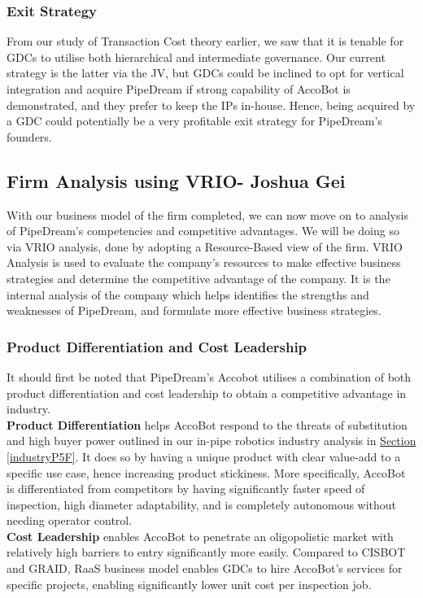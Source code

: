 \documentclass[11pt]{article}		%
\newcommand{\sectref}[1]{\hyperref[#1]{Section \ref*{#1}}}     %
\begin{document}
    	\subsubsection{Exit Strategy}
    	From our study of Transaction Cost theory earlier, we saw that it is tenable for GDCs to utilise both hierarchical and intermediate governance. Our current strategy is the latter via the JV, but GDCs could be inclined to opt for vertical integration and acquire PipeDream if strong capability of AccoBot is demonstrated, and they prefer to keep the IPs in-house. Hence, being acquired by a GDC could potentially be a very profitable exit strategy for PipeDream’s founders. 
            
	\subsection[Firm Analysis using VRIO]{Firm Analysis using VRIO- Joshua Gei}
	With our business model of the firm completed, we can now move on to analysis of PipeDream's competencies and competitive advantages. We will be doing so via VRIO analysis, done by adopting a Resource-Based view of the firm. VRIO Analysis is used to evaluate the company’s resources to make effective business strategies and determine the competitive advantage of the company. It is the internal analysis of the company which
    helps identifies the strengths and weaknesses of PipeDream, and formulate more effective business strategies. 
	
	\subsubsection{Product Differentiation and Cost Leadership}
	It should first be noted that PipeDream's Accobot utilises a combination of both product differentiation and cost leadership to obtain a competitive advantage in industry.
	\\ 
	\hspace*{3ex} \textbf{Product Differentiation} helps AccoBot respond to the threats of substitution and high buyer power outlined in our in-pipe robotics industry analysis in \sectref{industryP5F}. It does so by having a unique product with clear value-add to a specific use case, hence increasing product stickiness. More specifically, AccoBot is differentiated from competitors by having significantly faster speed of inspection, high diameter adaptability, and is completely autonomous without needing operator control.
	\\ \hspace*{3ex} \textbf{Cost Leadership} enables AccoBot to penetrate an oligopolistic market with relatively high barriers to entry significantly more easily. Compared to CISBOT and GRAID, RaaS business model enables GDCs to hire AccoBot's services for specific projects, enabling significantly lower unit cost per inspection job. 
	
\end{document}
